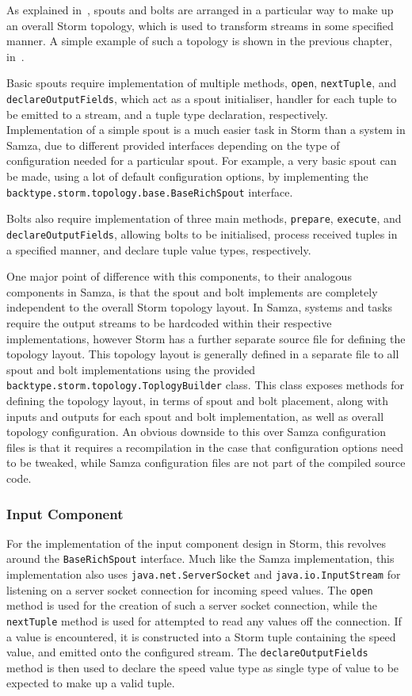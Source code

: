 As explained in~, spouts and bolts are arranged in a particular way to make up an overall Storm topology,
which is used to transform streams in some specified manner. A simple example of such a topology is shown in the previous
chapter, in~.

Basic spouts require implementation of multiple methods, \texttt{open}, \texttt{nextTuple}, and \texttt{declareOutputFields},
which act as a spout initialiser, handler for each tuple to be emitted to a stream, and a tuple type declaration, respectively.
Implementation of a simple spout is a much easier task in Storm than a system in Samza, due to different provided interfaces
depending on the type of configuration needed for a particular spout. For example, a very basic spout can be made, using
a lot of default configuration options, by implementing the \texttt{backtype.storm.topology.base.BaseRichSpout} interface.

Bolts also require implementation of three main methods, \texttt{prepare}, \texttt{execute}, and \texttt{declareOutputFields},
allowing bolts to be initialised, process received tuples in a specified manner, and declare tuple value types, respectively.

One major point of difference with this components, to their analogous components in Samza, is that the spout and bolt
implements are completely independent to the overall Storm topology layout. In Samza, systems and tasks require the output
streams to be hardcoded within their respective implementations, however Storm has a further separate source file for
defining the topology layout. This topology layout is generally defined in a separate file to all spout and bolt implementations
using the provided \texttt{backtype.storm.topology.ToplogyBuilder} class. This class exposes methods for defining the
topology layout, in terms of spout and bolt placement, along with inputs and outputs for each spout and bolt implementation,
as well as overall topology configuration. An obvious downside to this over Samza configuration files is that it requires
a recompilation in the case that configuration options need to be tweaked, while Samza configuration files are not part
of the compiled source code.

\subsubsection{Input Component}

For the implementation of the input component design in Storm, this revolves around the \texttt{BaseRichSpout} interface.
Much like the Samza implementation, this implementation also uses \texttt{java.net.ServerSocket} and \texttt{java.io.InputStream}
for listening on a server socket connection for incoming speed values. The \texttt{open} method is used for the creation
of such a server socket connection, while the \texttt{nextTuple} method is used for attempted to read any values off the
connection. If a value is encountered, it is constructed into a Storm tuple containing the speed value, and emitted onto
the configured stream. The \texttt{declareOutputFields} method is then used to declare the speed value type as single
type of value to be expected to make up a valid tuple.

